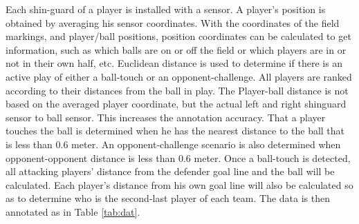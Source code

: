 Each shin-guard of a player is installed with a sensor.
A player's position is obtained by averaging his sensor coordinates.
With the coordinates of the field markings, and player/ball positions, position coordinates can be calculated to get information, such as which balls are on or off the field or which players are in or not in their own half, etc. 
Euclidean distance is used to determine if there is an active play of either a ball-touch or an opponent-challenge.
All players are ranked according to their distances from the ball in play.
The Player-ball distance is not based on the averaged player coordinate, but the actual left and right shinguard sensor to ball sensor. 
This increases the annotation accuracy. 
That a player touches the ball is determined when he has the nearest distance to the ball that is less than 0.6 meter.
An opponent-challenge scenario is also determined when opponent-opponent distance is less than 0.6 meter.
Once a ball-touch is detected, all attacking players' distance from the defender goal line and the ball will be calculated.
Each player's distance from his own goal line will also be calculated so as to determine who is the second-last player of each team. 
The data is then annotated as in Table \ref{tab:dat}.

